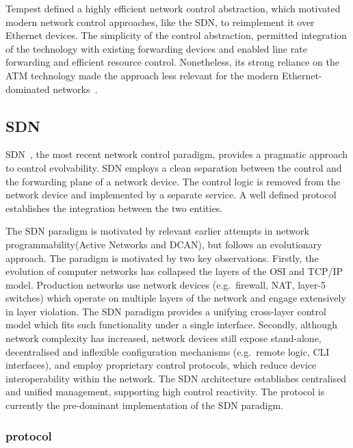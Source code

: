 Tempest defined a highly efficient network control abstraction, which motivated
modern network control approaches, like the SDN, to reimplement it over Ethernet
devices.  The simplicity of the control abstraction, permitted
integration of the technology with existing forwarding devices  and enabled line
rate forwarding and efficient resource control.  Nonetheless, its strong
reliance on the ATM technology made the approach less relevant for the modern
Ethernet-dominated networks~. 

\subsection{SDN}\label{sec:background:sdn} 

SDN~, the most recent network control paradigm, provides a pragmatic
approach to control evolvability. SDN employs  a clean separation between the
control and the forwarding plane of a network device. The control logic is
removed from the network device and implemented by a separate service.  A well
defined protocol establishes the integration between the two entities. 

The SDN paradigm is motivated by relevant earlier attempts in network
programmability(Active Networks and DCAN), but follows an evolutionary approach.
The paradigm is motivated by two key observations.  Firstly, the evolution of
computer networks has collapsed the layers of the OSI and TCP/IP model.
Production networks use network devices (e.g.~firewall, NAT, layer-5 switches)
which operate on multiple layers of the network and engage extensively in layer
violation.  The SDN paradigm provides a unifying cross-layer control model which
fits such functionality under a single interface.  Secondly, although network
complexity has increased, network devices still expose stand-alone,
decentralised and inflexible configuration mechanisms (e.g.~remote logic, CLI
interfaces), and employ proprietary control protocols, which reduce device
interoperability within the network. The SDN architecture establishes
centralised and unified management, supporting high control reactivity.  The \of
protocol is currently the pre-dominant implementation of the SDN paradigm.

\subsubsection*{\of protocol} 


